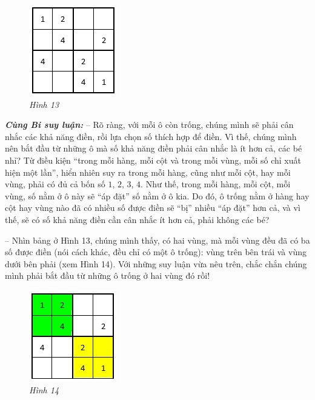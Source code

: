 	\begin{figure}
		\centering
		\captionsetup{labelformat= empty, justification=centering}
		\includegraphics[scale=1]{pic2}
		\caption{\small\textit{Hình 13}}
		\vspace*{-10pt}
	\end{figure}
	\textbf{\textit{Cùng Bi suy luận:}}
	\vskip 0.1cm
	-- Rõ ràng, với mỗi ô còn trống, chúng mình sẽ phải cân nhắc các khả năng điền, rồi lựa chọn số thích hợp để điền. Vì thế, chúng mình nên bắt đầu từ những ô mà số khả năng điền phải cân nhắc là ít hơn cả, các bé nhỉ? Từ điều kiện
	“trong mỗi hàng, mỗi cột và trong mỗi vùng, mỗi số chỉ xuất hiện một lần”, hiển nhiên suy ra trong mỗi hàng, cũng như mỗi cột, hay mỗi vùng, phải có đủ cả bốn số $1$, $2$, $3$, $4$. Như thế, trong mỗi hàng, mỗi cột, mỗi vùng, số nằm ở ô này sẽ “áp đặt” số nằm ở ô kia. Do đó, ô trống nằm ở hàng hay cột hay vùng nào đã có nhiều số được điền sẽ “bị” nhiều “áp đặt” hơn cả, và vì thế, sẽ có số khả năng điền cần cân nhắc ít hơn cả, phải không các bé?
	\vskip 0.1cm
	\begin{multicols}{2}
		-- Nhìn bảng ở Hình 13, chúng mình thấy, có hai vùng, mà mỗi vùng đều đã có ba số được điền (nói cách khác, đều chỉ có một ô trống): vùng trên bên trái và vùng dưới bên phải (xem Hình 14). Với những suy luận vừa nêu trên, chắc chắn chúng mình phải bắt đầu từ những ô trống ở hai vùng đó rồi!
		\begin{figure}[H]
			\centering
			\vspace*{5pt}
			\captionsetup{labelformat= empty, justification=centering}
			\includegraphics[scale=1]{pic3}
			\caption{\small\textit{Hình 14}}
			\vspace*{-10pt}
		\end{figure}
	\end{multicols}
